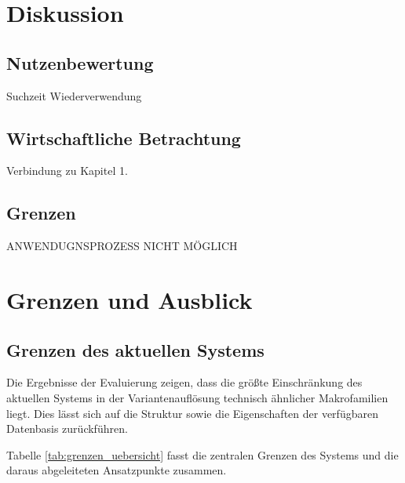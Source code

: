 

\chapter{Diskussion}
\label{chap:diskussion}

\section{Nutzenbewertung}

Suchzeit
Wiederverwendung

\section{Wirtschaftliche Betrachtung}

Verbindung zu Kapitel 1.

\section{Grenzen}


ANWENDUGNSPROZESS NICHT MÖGLICH

\chapter{Grenzen und Ausblick}
\label{chap:grenzen_und_ausblick}

\section{Grenzen des aktuellen Systems}

Die Ergebnisse der Evaluierung zeigen, dass die größte Einschränkung des aktuellen Systems in der Variantenauflösung technisch ähnlicher Makrofamilien liegt.
Dies lässt sich auf die Struktur sowie die Eigenschaften der verfügbaren Datenbasis zurückführen.\parencite{LTR_Configuration_Test_Series}

Tabelle \ref{tab:grenzen_uebersicht} fasst die zentralen Grenzen des Systems und die daraus abgeleiteten Ansatzpunkte zusammen.

